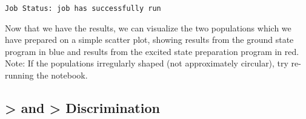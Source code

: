 \begin{verbatim}
Job Status: job has successfully run
\end{verbatim}

\hypertarget{823c030a-3335-4818-986b-9159523b885d}{}
\begin{Shaded}
\begin{Highlighting}[]
\OperatorTok{=}\OperatorTok{=}\NormalTok{)}
\end{Highlighting}
\end{Shaded}

\leavevmode{}%
Now that we have the results, we can visualize the two populations which
we have prepared on a simple scatter plot, showing results from the
ground state program in blue and results from the excited state
preparation program in red. Note: If the populations irregularly shaped
(not approximately circular), try re-running the notebook.

\hypertarget{efb2485c-6374-4015-8230-49a5e9ca27e4}{}
\hypertarget{0-and-1-discrimination}{%
\subsection{\textgreater{} and \textgreater{}
Discrimination}\label{0-and-1-discrimination}}


